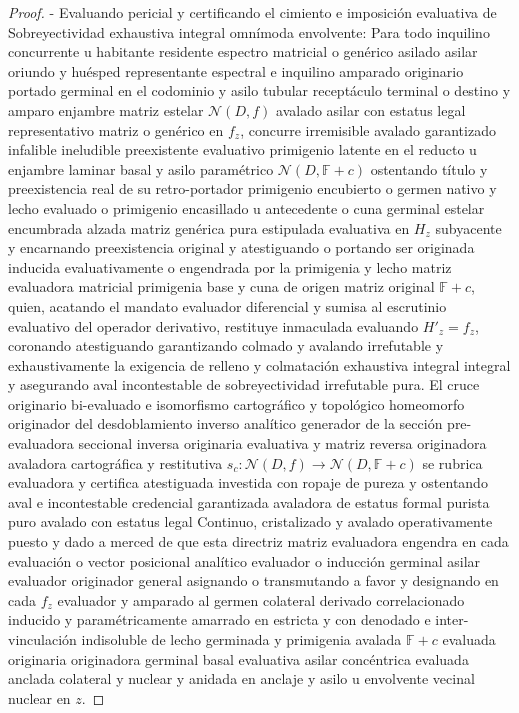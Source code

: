 \documentclass[11pt,a4paper]{article}
\theoremstyle{definition}
\theoremstyle{remark}
\numberwithin{equation}{section}
\begin{document}
\begin{proof}
- Evaluando pericial y certificando el cimiento e imposición evaluativa de Sobreyectividad exhaustiva integral omnímoda envolvente: Para todo inquilino concurrente u habitante residente espectro matricial o genérico asilado asilar oriundo y huésped representante espectral e inquilino amparado originario portado germinal en el codominio y asilo tubular receptáculo terminal o destino y amparo enjambre matriz estelar $\mathcal{N}(D, f)$ avalado asilar con estatus legal representativo matriz o genérico en $f_z$, concurre irremisible avalado garantizado infalible ineludible preexistente evaluativo primigenio latente en el reducto u enjambre laminar basal y asilo paramétrico $\mathcal{N}(D, \mathbb{F} + c)$ ostentando título y preexistencia real de su retro-portador primigenio encubierto o germen nativo y lecho evaluado o primigenio encasillado u antecedente o cuna germinal estelar encumbrada alzada matriz genérica pura estipulada evaluativa en $H_z$ subyacente y encarnando preexistencia original y atestiguando o portando ser originada inducida evaluativamente o engendrada por la primigenia y lecho matriz evaluadora matricial primigenia base y cuna de origen matriz original $\mathbb{F} + c$, quien, acatando el mandato evaluador diferencial y sumisa al escrutinio evaluativo del operador derivativo, restituye inmaculada evaluando $H'_z = f_z$, coronando atestiguando garantizando colmado y avalando irrefutable y exhaustivamente la exigencia de relleno y colmatación exhaustiva integral integral y asegurando aval incontestable de sobreyectividad irrefutable pura.
El cruce originario bi-evaluado e isomorfismo cartográfico y topológico homeomorfo originador del desdoblamiento inverso analítico generador de la sección pre-evaluadora seccional inversa originaria evaluativa y matriz reversa originadora avaladora cartográfica y restitutiva $s_c: \mathcal{N}(D, f) \to \mathcal{N}(D, \mathbb{F} + c)$ se rubrica evaluadora y certifica atestiguada investida con ropaje de pureza y ostentando aval e incontestable credencial garantizada avaladora de estatus formal purista puro avalado con estatus legal Continuo, cristalizado y avalado operativamente puesto y dado a merced de que esta directriz matriz evaluadora engendra en cada evaluación o vector posicional analítico evaluador o inducción germinal asilar evaluador originador general asignando o transmutando a favor y designando en cada $f_z$ evaluador y amparado al germen colateral derivado correlacionado inducido y paramétricamente amarrado en estricta y con denodado e inter-vinculación indisoluble de lecho germinada y primigenia avalada $\mathbb{F} + c$ evaluada originaria originadora germinal basal evaluativa asilar concéntrica evaluada anclada colateral y nuclear y anidada en anclaje y asilo u envolvente vecinal nuclear en $z$.

\end{proof}
\end{document}
